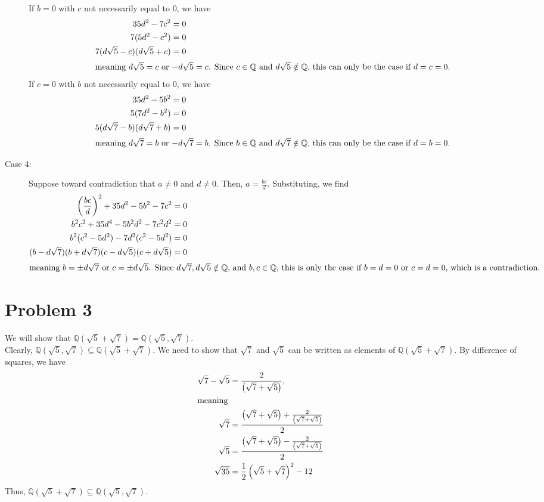 \documentclass[10pt]{extarticle}
\newcommand{\Q}{\mathbb{Q}}
\begin{document}
\begin{description}
      If $b = 0$ with $c$ not necessarily equal to $0$, we have
      \begin{align*}
        35d^2 - 7c^2 &= 0\\
        7(5d^2 - c^2) &= 0\\
        7(d\sqrt{5} - c)(d\sqrt{5} + c) &= 0\\
        \intertext{meaning $d\sqrt{5} = c$ or $-d\sqrt{5} = c$. Since $c\in\Q$ and $d\sqrt{5}\notin \Q$, this can only be the case if $d=c=0$.}
      \end{align*}
      If $c = 0$ with $b$ not necessarily equal to $0$, we have
      \begin{align*}
        35d^2 - 5b^2 &= 0\\
        5(7d^2 - b^2) &= 0\\
        5(d\sqrt{7} - b)(d\sqrt{7} + b) &= 0\\
        \intertext{meaning $d\sqrt{7} = b$ or $-d\sqrt{7} = b$. Since $b\in\Q$ and $d\sqrt{7}\notin \Q$, this can only be the case if $d=b=0$.}
      \end{align*}
    \item[Case 4:] Suppose toward contradiction that $a\neq 0$ and $d\neq 0$. Then, $a = \frac{bc}{d}$. Substituting, we find
      \begin{align*}
        \left(\frac{bc}{d}\right)^2 + 35d^2 - 5b^2 - 7c^2 &= 0\\
        b^2c^2 + 35d^4 - 5b^2d^2 - 7c^2d^2 &= 0\\
        b^2(c^2 - 5d^2) - 7d^2(c^2 - 5d^2) &= 0\\
        (b-d\sqrt{7})(b+d\sqrt{7})(c-d\sqrt{5})(c+d\sqrt{5}) &= 0\\
        \intertext{meaning $b = \pm d\sqrt{7}$ or $c = \pm d\sqrt{5}$. Since $d\sqrt{7},d\sqrt{5}\notin \Q$, and $b,c\in\Q$, this is only the case if $b=d=0$ or $c=d=0$, which is a contradiction.}
      \end{align*}
  \end{description}
  \section{Problem 3}%
  We will show that $\Q(\sqrt{5} + \sqrt{7}) = \Q(\sqrt{5},\sqrt{7})$.\\

  Clearly, $\Q(\sqrt{5},\sqrt{7})\subseteq \Q(\sqrt{5} + \sqrt{7})$. We need to show that $\sqrt{7}$ and $\sqrt{5}$ can be written as elements of $\Q(\sqrt{5} + \sqrt{7})$. By difference of squares, we have
  \begin{align*}
    \sqrt{7} - \sqrt{5} &= \frac{2}{\left(\sqrt{7} + \sqrt{5}\right)},\\
    \intertext{meaning}
    \sqrt{7} &= \frac{\left(\sqrt{7} + \sqrt{5}\right) + \frac{2}{\left(\sqrt{7} + \sqrt{5}\right)}}{2}\\
    \sqrt{5} &= \frac{\left(\sqrt{7} + \sqrt{5}\right) - \frac{2}{\left(\sqrt{7} + \sqrt{5}\right)}}{2}\\
    \sqrt{35} &= \frac{1}{2}\left(\sqrt{5} + \sqrt{7}\right)^2 - 12
  \end{align*}
  Thus, $\Q(\sqrt{5} + \sqrt{7})\subseteq \Q(\sqrt{5},\sqrt{7})$.
\end{document}
